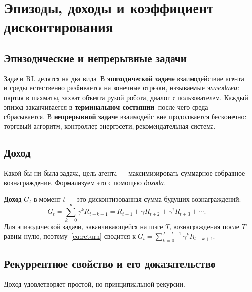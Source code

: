 \section{Эпизоды, доходы и коэффициент дисконтирования}
\label{sec:returns}

\subsection*{Эпизодические и непрерывные задачи}

Задачи RL делятся на два вида. В \textbf{эпизодической задаче} взаимодействие агента и среды естественно разбивается на конечные отрезки, называемые \emph{эпизодами}: партия в шахматы, захват объекта рукой робота, диалог с пользователем. Каждый эпизод заканчивается в \textbf{терминальном состоянии}, после чего среда сбрасывается. В \textbf{непрерывной задаче} взаимодействие продолжается бесконечно: торговый алгоритм, контроллер энергосети, рекомендательная система.

\subsection*{Доход}

Какой бы ни была задача, цель агента — максимизировать суммарное собранное вознаграждение. Формализуем это с помощью \emph{дохода}.

\begin{definition}[Доход]
\label{def:return}
\textbf{Доход} $G_t$ в момент $t$ — это дисконтированная сумма будущих вознаграждений:
\begin{equation}
\label{eq:return}
G_t = \sum_{k=0}^{\infty} \gamma^k R_{t+k+1}
    = R_{t+1} + \gamma R_{t+2} + \gamma^2 R_{t+3} + \cdots.
\end{equation}
Для эпизодической задачи, заканчивающейся на шаге $T$, вознаграждения после $T$ равны нулю, поэтому~\eqref{eq:return} сводится к $G_t = \sum_{k=0}^{T-t-1} \gamma^k R_{t+k+1}$.
\end{definition}

\subsection*{Рекуррентное свойство и его доказательство}

Доход удовлетворяет простой, но принципиальной рекурсии.

